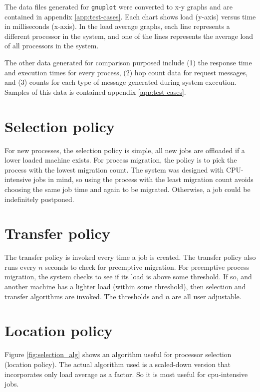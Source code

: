 \documentclass{report}
\begin{document}
The data files generated for \texttt{gnuplot} were converted to x-y graphs
and are contained in appendix \ref{app:test-cases}.  Each chart shows load
(y-axis) versus time in milliseconds (x-axis).  In the load average graphs,
each line represents a different processor in the system, and one of the
lines represents the average load of all processors in the system.

The other data generated for comparison purposed include (1) the response
time and execution times for every process, (2) hop count data for request
messages, and (3) counts for each type of message generated during system
execution.  Samples of this data is contained appendix \ref{app:test-cases}.

\section{Selection policy}

For new processes, the selection policy is simple, all new jobs are
offloaded if a lower loaded machine exists.  For process migration, the
policy is to pick the process with the lowest migration count.  The system
was designed with CPU-intensive jobs in mind, so using the process with the
least migration count avoids choosing the same job time and again to be
migrated.  Otherwise, a job could be indefinitely postponed.

\section{Transfer policy}

The transfer policy is invoked every time a job is created.  The transfer
policy also runs every $n$ seconds to check for preemptive migration.  For
preemptive process migration, the system checks to see if its load is above
some threshold.  If so, and another machine has a lighter load (within some
threshold), then selection and transfer algorithms are invoked.  The
thresholds and $n$ are all user adjustable.

\section{Location policy}


Figure \ref{fig:selection_alg} shows an algorithm useful for processor
selection (location policy).  The actual algorithm used is a scaled-down
version that incorporates only load average as a factor.  So it is most
useful for cpu-intensive jobs.
\end{document}
